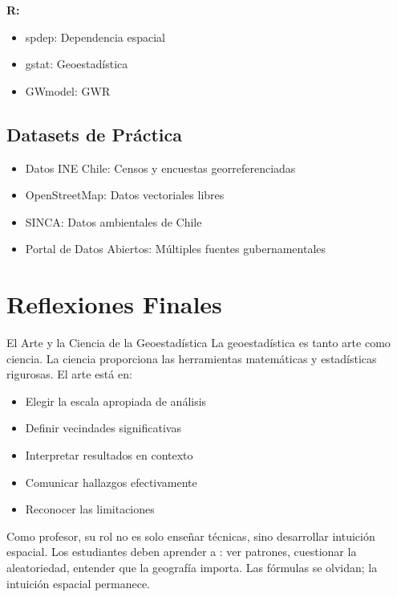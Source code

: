 \documentclass[12pt,a4paper]{article}
\begin{document}
\textbf{R:}
\begin{itemize}
    \item spdep: Dependencia espacial
    \item gstat: Geoestadística
    \item GWmodel: GWR
\end{itemize}

\subsection{Datasets de Práctica}

\begin{itemize}
    \item Datos INE Chile: Censos y encuestas georreferenciadas
    \item OpenStreetMap: Datos vectoriales libres
    \item SINCA: Datos ambientales de Chile
    \item Portal de Datos Abiertos: Múltiples fuentes gubernamentales
\end{itemize}

\section{Reflexiones Finales}

\begin{conceptbox}{El Arte y la Ciencia de la Geoestadística}
La geoestadística es tanto arte como ciencia. La ciencia proporciona las herramientas matemáticas y estadísticas rigurosas. El arte está en:
\begin{itemize}
    \item Elegir la escala apropiada de análisis
    \item Definir vecindades significativas
    \item Interpretar resultados en contexto
    \item Comunicar hallazgos efectivamente
    \item Reconocer las limitaciones
\end{itemize}
\end{conceptbox}

\begin{reflexion}
Como profesor, su rol no es solo enseñar técnicas, sino desarrollar intuición espacial. Los estudiantes deben aprender a : ver patrones, cuestionar la aleatoriedad, entender que la geografía importa. Las fórmulas se olvidan; la intuición espacial permanece.
\end{reflexion}
\end{document}
